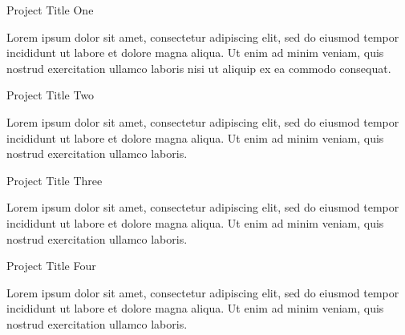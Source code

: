 \begin{projects}
  \projectentry
    {Project Title One}
    {}
    {}
    {}
    {
      \begin{cvitems}
        \item {Lorem ipsum dolor sit amet, consectetur adipiscing elit, sed do eiusmod tempor incididunt ut labore et dolore magna aliqua. Ut enim ad minim veniam, quis nostrud exercitation ullamco laboris nisi ut aliquip ex ea commodo consequat.}
      \end{cvitems}
    }
  \projectentry
    {Project Title Two}
    {}
    {}
    {}
    {
      \begin{cvitems}
        \item {Lorem ipsum dolor sit amet, consectetur adipiscing elit, sed do eiusmod tempor incididunt ut labore et dolore magna aliqua. Ut enim ad minim veniam, quis nostrud exercitation ullamco laboris.}
      \end{cvitems}
    }
  \projectentry
    {Project Title Three}
    {}
    {}
    {}
    {
      \begin{cvitems}
        \item {Lorem ipsum dolor sit amet, consectetur adipiscing elit, sed do eiusmod tempor incididunt ut labore et dolore magna aliqua. Ut enim ad minim veniam, quis nostrud exercitation ullamco laboris.}
      \end{cvitems}
    }
  \projectentry
    {Project Title Four}
    {}
    {}
    {}
    {
      \begin{cvitems}
        \item {Lorem ipsum dolor sit amet, consectetur adipiscing elit, sed do eiusmod tempor incididunt ut labore et dolore magna aliqua. Ut enim ad minim veniam, quis nostrud exercitation ullamco laboris.}
      \end{cvitems}
    }
\end{projects}
